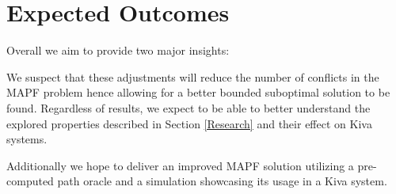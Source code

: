 \documentclass[a4paper,11pt]{article}
\begin{document}
\section{Expected Outcomes}
Overall we aim to provide two major insights:

We suspect that these adjustments will reduce the number of conflicts in the MAPF problem hence allowing for a better bounded suboptimal solution to be found. Regardless of results, we expect to be able to better understand the explored properties described in Section \ref{Research} and their effect on Kiva systems.

Additionally we hope to deliver an improved MAPF solution utilizing a pre-computed path oracle and a simulation showcasing its usage in a Kiva system.



\end{document}
